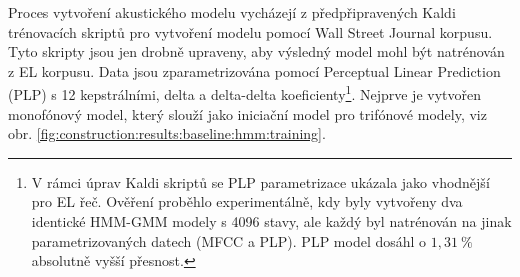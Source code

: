 


Proces vytvoření akustického modelu vycházejí z předpřipravených Kaldi trénovacích skriptů pro vytvoření modelu pomocí Wall Street Journal korpusu. Tyto skripty jsou jen drobně upraveny, aby výsledný model mohl být natrénován z EL korpusu. Data jsou zparametrizována pomocí Perceptual Linear Prediction (PLP) s 12 kepstrálními, delta a delta-delta koeficienty\footnote{V rámci úprav Kaldi skriptů se PLP parametrizace ukázala jako vhodnější pro EL řeč. Ověření proběhlo experimentálně, kdy byly vytvořeny dva identické HMM-GMM modely s 4096 stavy, ale každý byl natrénován na jinak parametrizovaných datech (MFCC a PLP). PLP model dosáhl o $1,31\ \%$ absolutně vyšší přesnost.}. Nejprve je vytvořen monofónový model, který slouží jako iniciační model pro trifónové  modely, viz obr. \ref{fig:construction:results:baseline:hmm:training}.


